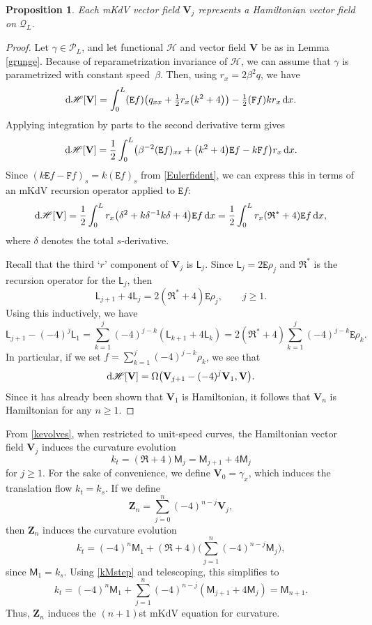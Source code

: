 \documentclass[pdftex]{sigma}
\def\opR{\mathfrak R}
\newcommand\Leg{ {\mathcal P}} %
\newcommand\Legq{\mathcal Q}
\def\Fop{\mathtt F} %
\def\Euler{\mathtt E}
\newcommand\uM{\mathsf M} %
\newcommand\uL{\mathsf L} %
\newcommand\kk{k} %
\newcommand\speed{\beta} %
\def\vecV{\mathbf V}
\newcommand\VV{\mathbf V}
\newcommand\VZ{\mathbf Z}
\newcommand\funH{{\mathscr H}} %
\newcommand{\dx}{\,{\rm d}x}
\def\gam{\gamma} %
\numberwithin{equation}{section}
\newtheorem{Proposition}[Theorem]{Proposition}
 { \theoremstyle{definition}
\newtheorem{Definition}[Theorem]{Definition}
\newtheorem{Note}[Theorem]{Note}
\newtheorem{Example}[Theorem]{Example}
\newtheorem{Remark}[Theorem]{Remark} }
\begin{document}
\begin{Proposition} Each mKdV vector field $\vecV_j$ represents a Hamiltonian vector field on $\Legq_L$.
\end{Proposition}
\begin{proof}
Let $\gam \in \Leg_L$, and let functional $\funH$ and vector field $\VV$ be as in Lemma \ref{grunge}. Because of reparametrization invariance of $\funH$, we can assume that $\gam$ is parametrized with constant speed~$\speed$. Then, using $r_x= 2\speed^2 q$, we have
\[{\rm d}\funH[\VV] = \int_0^L (\Euler f) \bigl( q_{xx} + \tfrac12 r_x \bigl(\kk^2 + 4\bigr)\bigr) - \tfrac12 (\Fop f)k r_x \dx.\]
Applying integration by parts to the second derivative term gives
\[{\rm d}\funH[\VV] =\frac12 \int_0^L \bigl( \beta^{-2} (\Euler f)_{xx} + \bigl(\kk^2+4\bigr) \Euler f - \kk \Fop f\bigr) r_x \dx.\]
Since $(\kk \Euler f -\Fop f)_s = \kk (\Euler f)_s$ from \eqref{Eulerfident}, we can express this in terms of an mKdV recursion operator applied to $\Euler f$:
\[
{\rm d}\funH[\VV] = \frac12 \int_0^L r_x \bigl(\delta^2 + \kk \delta^{-1} \kk \delta + 4\bigr) \Euler f \dx = \frac12 \int_0^L r_x (\opR^* + 4) \Euler f \dx,
\]
where $\delta$ denotes the total $s$-derivative.

Recall that the third `$r$' component of $\VV_j$ is $\uL_j$. Since $\uL_j = 2\Euler \rho_j$ and $\opR^*$ is the recursion operator for the $\uL_j$, then
\[\uL_{j+1} + 4 \uL_j = 2(\opR^* + 4)\Euler \rho_j, \qquad j\ge 1.\]
Using this inductively, we have
\[\uL_{j+1} - (-4)^j \uL_1 = \sum_{k=1}^j (-4)^{j-k} (\uL_{k+1} + 4 \uL_k) = 2 (\opR^* + 4) \sum_{k=1}^j (-4)^{j-k} \Euler \rho_k.\]
In particular, if we set $f = \sum_{k=1}^j (-4)^{j-k}\rho_k$, we see that
\[{\rm d}\funH[\VV] = \Omega\bigl(\vecV_{j+1} -(-4)^j \vecV_1, \VV\bigr).\]
Since it has already been shown that $\vecV_1$ is Hamiltonian, it follows that $\vecV_{n}$ is Hamiltonian for any $n\ge 1$.
\end{proof}

From \eqref{kevolves}, when restricted to unit-speed curves, the Hamiltonian vector field $\vecV_j$ induces the curvature evolution
\begin{equation}\label{kMstep}
\kk_t = (\opR + 4) \uM_j = \uM_{j+1} + 4 \uM_j
\end{equation}
for $j\ge 1$. For the sake of convenience, we define $\vecV_0 = \gam_x$, which induces the translation flow $k_t = k_s$.
If we define
\[
\VZ_n = \sum_{j=0}^n (-4)^{n-j} \vecV_j,
\]
then $\VZ_n$ induces the curvature evolution
\[
\kk_t = (-4)^n \uM_1 + (\opR+4) \Biggl( \sum_{j=1}^n (-4)^{n-j} \uM_j \Biggr),
\]
since $\uM_1 = \kk_s$. Using \eqref{kMstep} and telescoping, this simplifies to
\[\kk_t = (-4)^n \uM_1 +\sum_{j=1}^n (-4)^{n-j} (\uM_{j+1} + 4 \uM_j) = \uM_{n+1}.\]
Thus, $\VZ_n$ induces the $(n+1)$st mKdV equation for curvature.
\end{document}
